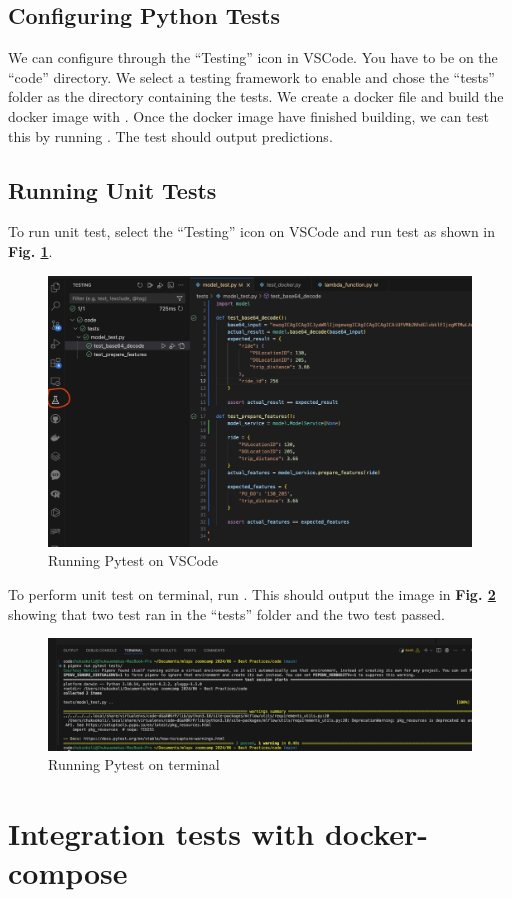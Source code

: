 \documentclass[letterpaper,12pt,notitlepage,twoside]{report}
\begin{document}
\subsection*{Configuring Python Tests}
We can configure through the ``Testing'' icon in VSCode. You have to be on the ``code'' directory. We select a testing framework to enable and chose the ``tests'' folder as the directory containing the tests. We create a docker file and build the docker image with . Once the docker image have finished building, we can test this by running . The test should output predictions. 

\subsection*{Running Unit Tests}
To run unit test, select the ``Testing'' icon on VSCode and run test as shown in \textbf{Fig. \ref{fig:16}}.
\begin{figure}[h]
	\centering
	\includegraphics[width=\textwidth]{Images/unit-test-on-vscode.png}
	\caption{Running Pytest on VSCode}
	\label{fig:16}
\end{figure}
\FloatBarrier

To perform unit test on terminal, run . This should output the image in \textbf{Fig. \ref{fig:17}} showing that two test ran in the ``tests'' folder and the two test passed.

\begin{figure}[h]
	\centering
	\includegraphics[width=\textwidth]{Images/unit-test-on-terminal.png}
	\caption{Running Pytest on terminal}
	\label{fig:17}
\end{figure}
\FloatBarrier

\section{Integration tests with docker-compose}
\end{document}
